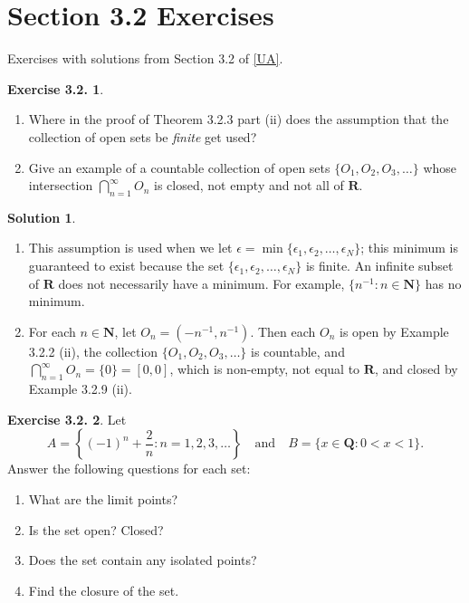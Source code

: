 \documentclass[12pt]{article}
\theoremstyle{definition}
\theoremstyle{exercise}
\newtheorem{exercise}{Exercise 3.2.}
\theoremstyle{solution}
\newtheorem*{solution}{Solution}
\newcommand{\quand}{\quad \text{and} \quad}
\newcommand{\N}{\mathbf{N}}
\newcommand{\Q}{\mathbf{Q}}
\newcommand{\R}{\mathbf{R}}
\begin{document}
\section{Section 3.2 Exercises}

Exercises with solutions from Section 3.2 of \hyperlink{ua}{[UA]}.

\begin{exercise}
\label{ex:1}
    \begin{enumerate}
        \item Where in the proof of Theorem 3.2.3 part (ii) does the assumption that the collection of open sets be \textit{finite} get used?

        \item Give an example of a countable collection of open sets \( \{ O_1, O_2, O_3, \ldots \} \) whose intersection \( \bigcap_{n=1}^{\infty} O_n \) is closed, not empty and not all of \( \R \).
    \end{enumerate}
\end{exercise}

\begin{solution}
    \begin{enumerate}
        \item This assumption is used when we let \( \epsilon = \min \{ \epsilon_1, \epsilon_2, \ldots, \epsilon_N \} \); this minimum is guaranteed to exist because the set \( \{ \epsilon_1, \epsilon_2, \ldots, \epsilon_N \} \) is finite. An infinite subset of \( \R \) does not necessarily have a minimum. For example, \( \{ n^{-1} : n \in \N \} \) has no minimum.

        \item For each \( n \in \N \), let \( O_n = (-n^{-1}, n^{-1}) \). Then each \( O_n \) is open by Example 3.2.2 (ii), the collection \( \{ O_1, O_2, O_3, \ldots \} \) is countable, and \( \bigcap_{n=1}^{\infty} O_n = \{ 0 \} = [0, 0] \), which is non-empty, not equal to \( \R \), and closed by Example 3.2.9 (ii).
    \end{enumerate}
\end{solution}

\begin{exercise}
\label{ex:2}
    Let
    \[
        A = \left\{ (-1)^n + \frac{2}{n} : n = 1, 2, 3, \ldots \right\} \quand B = \{ x \in \Q : 0 < x < 1 \}.
    \]
    Answer the following questions for each set:
    \begin{enumerate}
        \item What are the limit points?

        \item Is the set open? Closed?

        \item Does the set contain any isolated points?

        \item Find the closure of the set.
    \end{enumerate}
\end{exercise}
\end{document}
